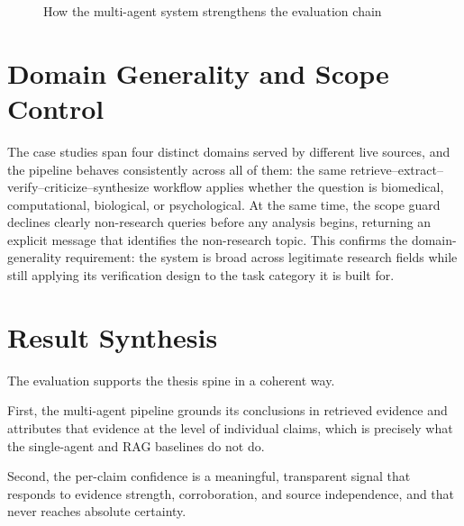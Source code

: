 \begin{figure}[!htbp]
\centering
{}
\caption{How the multi-agent system strengthens the evaluation chain}
\label{fig:results_flow}
\end{figure}

\section{Domain Generality and Scope Control }

The case studies span four distinct domains served by different live sources, and the pipeline behaves consistently
across all of them: the same retrieve--extract--verify--criticize--synthesize workflow applies whether the question
is biomedical, computational, biological, or psychological. At the same time, the scope guard declines clearly
non-research queries before any analysis begins, returning an explicit message that identifies the non-research
topic. This confirms the domain-generality requirement: the system is broad across legitimate research fields while
still applying its verification design to the task category it is built for.

\section{Result Synthesis }

The evaluation supports the thesis spine in a coherent way.

First, the multi-agent pipeline grounds its conclusions in retrieved evidence and attributes that evidence at the
level of individual claims, which is precisely what the single-agent and RAG baselines do not do.

Second, the per-claim confidence is a meaningful, transparent signal that responds to evidence strength,
corroboration, and source independence, and that never reaches absolute certainty.

